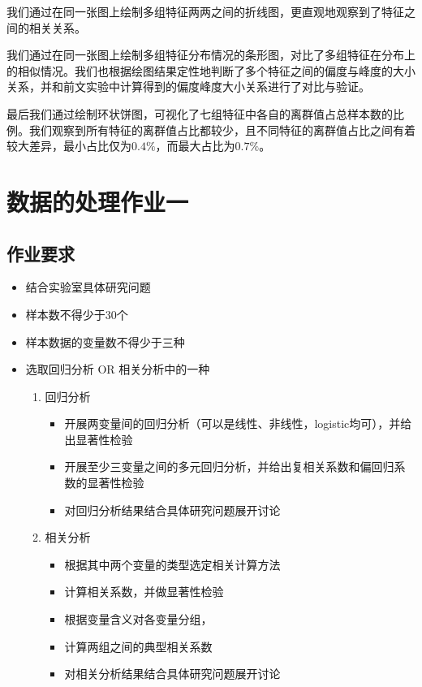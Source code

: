 \documentclass[UTF8]{ctexart}
\begin{document}
	我们通过在同一张图上绘制多组特征两两之间的折线图，更直观地观察到了特征之间的相关关系。
	
	我们通过在同一张图上绘制多组特征分布情况的条形图，对比了多组特征在分布上的相似情况。我们也根据绘图结果定性地判断了多个特征之间的偏度与峰度的大小关系，并和前文实验中计算得到的偏度峰度大小关系进行了对比与验证。
	
	最后我们通过绘制环状饼图，可视化了七组特征中各自的离群值占总样本数的比例。我们观察到所有特征的离群值占比都较少，且不同特征的离群值占比之间有着较大差异，最小占比仅为$0.4\%$，而最大占比为$0.7\%$。
	
	
	\section{数据的处理作业一}
	
	\subsection{作业要求}
	
		\begin{itemize}
		\item 结合实验室具体研究问题
		\item 样本数不得少于30个
		\item 样本数据的变量数不得少于三种
		\item 选取回归分析 OR 相关分析中的一种
		\begin{enumerate}
			\item 回归分析
			\begin{itemize}
				\item 开展两变量间的回归分析（可以是线性、非线性，logistic均可），并给出显著性检验
				\item 开展至少三变量之间的多元回归分析，并给出复相关系数和偏回归系数的显著性检验
				\item 对回归分析结果结合具体研究问题展开讨论
			\end{itemize} 
			\item 相关分析
			\begin{itemize}
				\item 根据其中两个变量的类型选定相关计算方法
				\item 计算相关系数，并做显著性检验
				\item 根据变量含义对各变量分组，
				\item 计算两组之间的典型相关系数
				\item 对相关分析结果结合具体研究问题展开讨论
			\end{itemize} 
		\end{enumerate}
		
	\end{itemize} 
\end{document}
